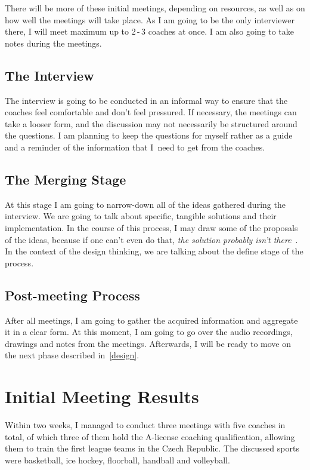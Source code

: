 There will be more of these initial meetings, depending on resources, as well as on how well the meetings will take place. As I am going to be the only interviewer there, I will meet maximum up to 2\,-\,3 coaches at once. I am also going to take notes during the meetings.

\subsection{The Interview}
The interview is going to be conducted in an informal way to ensure that the coaches feel comfortable and don’t feel pressured. If necessary, the meetings can take a looser form, and the discussion may not necessarily be structured around the questions. I am planning to keep the questions for myself rather as a guide and a reminder of the information that I~need to get from the coaches.

\subsection{The Merging Stage}
At this stage I am going to narrow-down all of the ideas gathered during the interview. We are going to talk about specific, tangible solutions and their implementation. In the course of this process, I may draw some of the proposals of the ideas, because if one can’t even do that, \textit{the solution probably isn’t there}~\cite{McCue}. In the context of the design thinking, we are talking about the define stage of the process.

\subsection{Post-meeting Process}
After all meetings, I am going to gather the acquired information and aggregate it in a clear form. At this moment, I am going to go over the audio recordings, drawings and notes from the meetings. Afterwards, I will be ready to move on the next phase described in~\ref{design}. 

\section{Initial Meeting Results}
Within two weeks, I managed to conduct three meetings with five coaches in total, of which three of them hold the A-license coaching qualification, allowing them to train the first league teams in the Czech Republic. The discussed sports were basketball, ice hockey, floorball, handball and volleyball.


